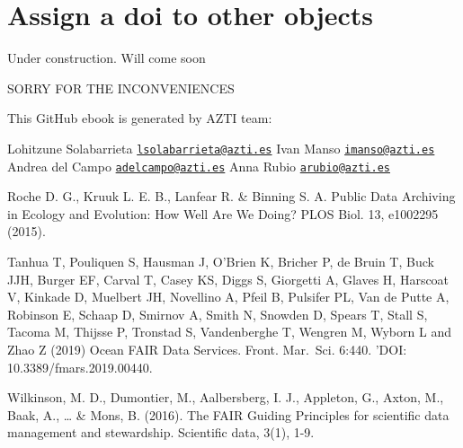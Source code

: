 \documentclass[
]{book}
\begin{document}
\hypertarget{assign-a-doi-to-other-objects}{%
\chapter{Assign a doi to other objects}\label{assign-a-doi-to-other-objects}}

Under construction. Will come soon

SORRY FOR THE INCONVENIENCES

This GitHub ebook is generated by AZTI team:

Lohitzune Solabarrieta \href{mailto:lsolabarrieta@azti.es}{\nolinkurl{lsolabarrieta@azti.es}}
Ivan Manso \href{mailto:imanso@azti.es}{\nolinkurl{imanso@azti.es}}
Andrea del Campo \href{mailto:adelcampo@azti.es}{\nolinkurl{adelcampo@azti.es}}
Anna Rubio \href{mailto:arubio@azti.es}{\nolinkurl{arubio@azti.es}}

Roche D. G., Kruuk L. E. B., Lanfear R. \& Binning S. A. Public Data Archiving in Ecology and Evolution: How Well Are We Doing? PLOS Biol. 13, e1002295 (2015).

Tanhua T, Pouliquen S, Hausman J, O'Brien K, Bricher P, de Bruin T, Buck JJH, Burger EF, Carval T, Casey KS, Diggs S, Giorgetti A, Glaves H, Harscoat V, Kinkade D, Muelbert JH, Novellino A, Pfeil B, Pulsifer PL, Van de Putte A, Robinson E, Schaap D, Smirnov A, Smith N, Snowden D, Spears T, Stall S, Tacoma M, Thijsse P, Tronstad S, Vandenberghe T, Wengren M, Wyborn L and Zhao Z (2019) Ocean FAIR Data Services. Front. Mar.~Sci. 6:440. 'DOI: 10.3389/fmars.2019.00440.

Wilkinson, M. D., Dumontier, M., Aalbersberg, I. J., Appleton, G., Axton, M., Baak, A., \ldots{} \& Mons, B. (2016). The FAIR Guiding Principles for scientific data management and stewardship. Scientific data, 3(1), 1-9.

  
\end{document}
